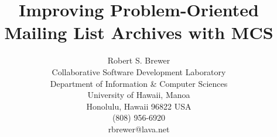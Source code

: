 






\title{Improving Problem-Oriented\\Mailing List Archives with MCS}

\author{
        \hspace*{-2ex}
        \parbox{4.0in} {\begin{center}
        {\authornamefont Robert S. Brewer}\\ 
        Collaborative Software Development Laboratory\\
        Department of Information \& Computer Sciences\\
        University of Hawaii, Manoa\\
        Honolulu, Hawaii 96822  USA\\
        (808) 956-6920\\
        rbrewer@lava.net
        \end{center} }
}

\maketitle


\copyrightspace

